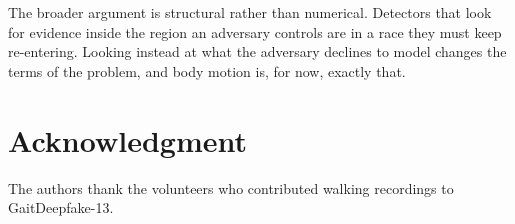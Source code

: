 \documentclass[journal]{IEEEtran}
\begin{document}
The broader argument is structural rather than numerical. Detectors that look
for evidence inside the region an adversary controls are in a race they must
keep re-entering. Looking instead at what the adversary declines to model
changes the terms of the problem, and body motion is, for now, exactly that.

\section*{Acknowledgment}

The authors thank the volunteers who contributed walking recordings to
GaitDeepfake-13.



\end{document}
